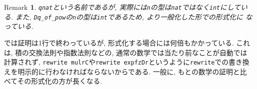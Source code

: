\documentclass[11pt]{jarticle}
\theoremstyle{mystyle}
\newtheorem{rmk}[df]{$\textrm{Remark}$}
\newcommand{\brmk}{\begin{rmk}}
\newcommand{\ermk}{\end{rmk}}
\newcommand{\0}{\textbf{0}}
\newcommand{\1}{\textbf{1}}
\newcommand{\2}{\textbf{2}}
\begin{document}
\brmk
  {\tt qnat}という名前であるが, 実際には{\tt n}の型は{\tt nat}ではなく{\tt int}にしている. 
  また, {\tt Dq\_of\_pow}の{\tt n}の型は{\tt int}であるため, より一般化した形での形式化に
  なっている. 
\ermk
\cite{Kac}では証明は1行で終わっているが, 形式化する場合には何倍もかかっている. これは, 積の交換法則や指数法則などの, 通常の数学では当たり前なことが自動では計算されず, {\tt rewrite mulrC}や{\tt rewrite expfzDr}というように{\tt rewrite}での書き換えを明示的に行わなければならないからである. 一般に, もとの数学の証明と比べてその形式化の方が長くなる. 
\end{document}
